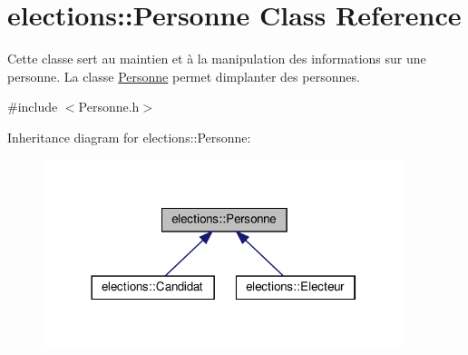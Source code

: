 \hypertarget{classelections_1_1Personne}{}\section{elections\+:\+:Personne Class Reference}
\label{classelections_1_1Personne}


Cette classe sert au maintien et à la manipulation des informations sur une personne. La classe \hyperlink{classelections_1_1Personne}{Personne} permet d\textquotesingle{}implanter des personnes.  




{\ttfamily \#include $<$Personne.\+h$>$}



Inheritance diagram for elections\+:\+:Personne\+:\nopagebreak
\begin{figure}[H]
\begin{center}
\leavevmode
\includegraphics[width=297pt]{classelections_1_1Personne__inherit__graph}
\end{center}
\end{figure}
